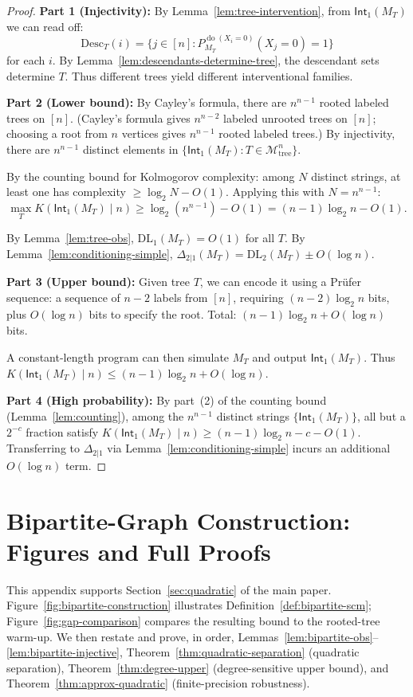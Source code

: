 \documentclass{article}
\theoremstyle{plain}
\theoremstyle{definition}
\newcommand{\calM}{\mathcal{M}}
\newcommand{\Int}{\mathsf{Int}}
\newcommand{\DL}{\mathrm{DL}}
\newcommand{\Desc}{\mathrm{Desc}}
\DeclareMathOperator{\doop}{do}
\begin{document}
\begin{proof}
\textbf{Part 1 (Injectivity):} By Lemma~\ref{lem:tree-intervention}, from $\Int_1(M_T)$ we can read off:
\[
\Desc_T(i) = \{j \in [n] : P_{M_T}^{\doop(X_i = 0)}(X_j = 0) = 1\}
\]
for each $i$. By Lemma~\ref{lem:descendants-determine-tree}, the descendant sets determine $T$. Thus different trees yield different interventional families.

\textbf{Part 2 (Lower bound):} By Cayley's formula, there are $n^{n-1}$ rooted labeled trees on $[n]$. (Cayley's formula gives $n^{n-2}$ labeled unrooted trees on $[n]$; choosing a root from $n$ vertices gives $n^{n-1}$ rooted labeled trees.) By injectivity, there are $n^{n-1}$ distinct elements in $\{\Int_1(M_T) : T \in \calM_{\mathrm{tree}}^n\}$.

By the counting bound for Kolmogorov complexity: among $N$ distinct strings, at least one has complexity $\geq \log_2 N - O(1)$. Applying this with $N = n^{n-1}$:
\[
\max_T K(\Int_1(M_T) \mid n) \geq \log_2(n^{n-1}) - O(1) = (n-1)\log_2 n - O(1).
\]

By Lemma~\ref{lem:tree-obs}, $\DL_1(M_T) = O(1)$ for all $T$. By Lemma~\ref{lem:conditioning-simple}, $\Delta_{2|1}(M_T) = \DL_2(M_T) \pm O(\log n)$.

\textbf{Part 3 (Upper bound):} Given tree $T$, we can encode it using a Pr\"ufer sequence: a sequence of $n-2$ labels from $[n]$, requiring $(n-2)\log_2 n$ bits, plus $O(\log n)$ bits to specify the root. Total: $(n-1)\log_2 n + O(\log n)$ bits.

A constant-length program can then simulate $M_T$ and output $\Int_1(M_T)$. Thus $K(\Int_1(M_T) \mid n) \leq (n-1)\log_2 n + O(\log n)$.

\textbf{Part 4 (High probability):} By part~(2) of the counting bound (Lemma~\ref{lem:counting}), among the $n^{n-1}$ distinct strings $\{\Int_1(M_T)\}$, all but a $2^{-c}$ fraction satisfy $K(\Int_1(M_T) \mid n) \geq (n-1)\log_2 n - c - O(1)$. Transferring to $\Delta_{2|1}$ via Lemma~\ref{lem:conditioning-simple} incurs an additional $O(\log n)$ term.
\end{proof}

\section{Bipartite-Graph Construction: Figures and Full Proofs}
\label{app:bipartite-proofs}

This appendix supports Section~\ref{sec:quadratic} of the main paper. Figure~\ref{fig:bipartite-construction} illustrates Definition~\ref{def:bipartite-scm}; Figure~\ref{fig:gap-comparison} compares the resulting bound to the rooted-tree warm-up. We then restate and prove, in order, Lemmas~\ref{lem:bipartite-obs}--\ref{lem:bipartite-injective}, Theorem~\ref{thm:quadratic-separation} (quadratic separation), Theorem~\ref{thm:degree-upper} (degree-sensitive upper bound), and Theorem~\ref{thm:approx-quadratic} (finite-precision robustness).
\end{document}

